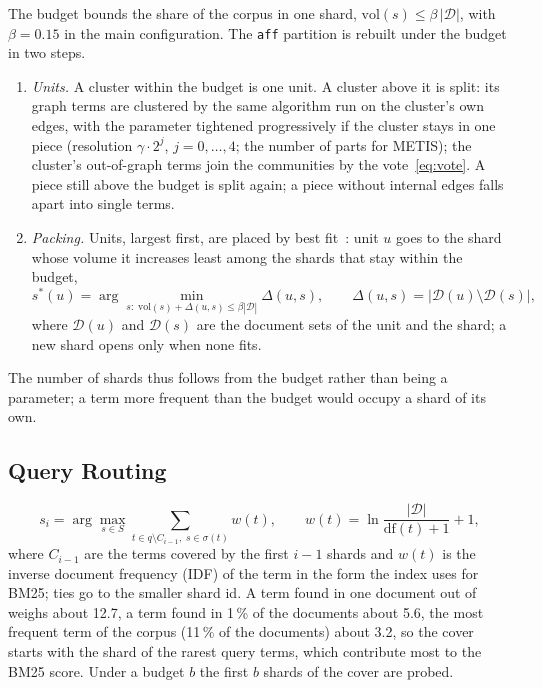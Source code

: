 \documentclass[11pt, a4paper]{article}
\newif\ifdraftnotes
\newcommand{\todo}[1]{\ifdraftnotes\par\noindent{\small\color{red!75!black}\textbf{TODO:} #1}\par\fi}
\newcommand{\strategy}[1]{\texttt{#1}}
\begin{document}
The budget bounds the share of the corpus in one shard, $\mathrm{vol}(s)\le\beta\,|\mathcal{D}|$, with $\beta=0.15$ in the main configuration.
The \strategy{aff} partition is rebuilt under the budget in two steps.
\begin{enumerate}
	\item \emph{Units.} A cluster within the budget is one unit. A cluster above it is split: its graph terms are clustered by the same algorithm run on the cluster's own edges, with the parameter tightened progressively if the cluster stays in one piece (resolution $\gamma\cdot2^{j}$, $j=0,\dots,4$; the number of parts for METIS); the cluster's out-of-graph terms join the communities by the vote~\eqref{eq:vote}. A piece still above the budget is split again; a piece without internal edges falls apart into single terms.
	\item \emph{Packing.} Units, largest first, are placed by best fit~\cite{johnson1974}: unit $u$ goes to the shard whose volume it increases least among the shards that stay within the budget,
	\begin{equation}
		s^*(u)=\arg\min_{s:\;\mathrm{vol}(s)+\Delta(u,s)\le\beta|\mathcal{D}|}\Delta(u,s),
		\qquad
		\Delta(u,s)=\bigl|\mathcal{D}(u)\setminus\mathcal{D}(s)\bigr|,
		\label{eq:packing}
	\end{equation}
	where $\mathcal{D}(u)$ and $\mathcal{D}(s)$ are the document sets of the unit and the shard; a new shard opens only when none fits.
\end{enumerate}
The number of shards thus follows from the budget rather than being a parameter; a term more frequent than the budget would occupy a shard of its own.

\subsection{Query Routing}

\todo{Text: greedy cover (Eq.~\eqref{eq:routing}), IDF weights (the shard of the rarest terms is probed first), determinism, shard budget $b$. Materials: none.}

\begin{equation}
	s_i=\arg\max_{s\in S}\sum_{t\in q\setminus C_{i-1},\; s\in\sigma(t)} w(t),
	\qquad
	w(t)=\ln\frac{|\mathcal{D}|}{\mathrm{df}(t)+1}+1,
	\label{eq:routing}
\end{equation}
where $C_{i-1}$ are the terms covered by the first $i-1$ shards and $w(t)$ is the inverse document frequency (IDF) of the term in the form the index uses for BM25; ties go to the smaller shard id.
A term found in one document out of \nDocs{} weighs about 12.7, a term found in 1\,\% of the documents about 5.6, the most frequent term of the corpus (11\,\% of the documents) about 3.2, so the cover starts with the shard of the rarest query terms, which contribute most to the BM25 score.
Under a budget $b$ the first $b$ shards of the cover are probed.
\end{document}
